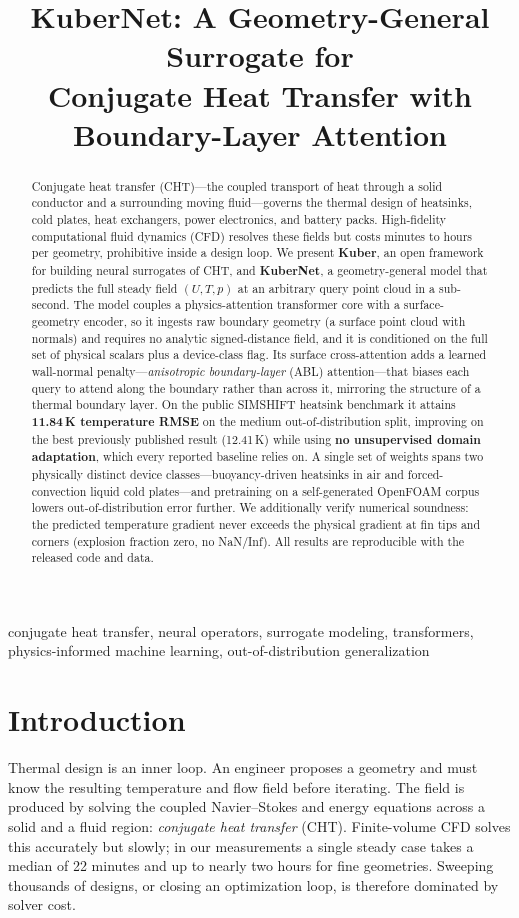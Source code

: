 \documentclass[conference]{IEEEtran}
\title{KuberNet: A Geometry-General Surrogate for\\ Conjugate Heat Transfer with Boundary-Layer Attention}
\author{\IEEEauthorblockN{Shubh Jain\textsuperscript{*}\quad Hardik Agarwal\textsuperscript{*}}
\IEEEauthorblockA{\texttt{github.com/ShubhJain007/Kuber}\\
\textsuperscript{*}\,Equal contribution}}
\begin{document}
\maketitle

\begin{abstract}
Conjugate heat transfer (CHT)---the coupled transport of heat through a solid conductor and a
surrounding moving fluid---governs the thermal design of heatsinks, cold plates, heat exchangers,
power electronics, and battery packs. High-fidelity computational fluid dynamics (CFD) resolves these fields but costs minutes to
hours per geometry, prohibitive inside a design loop. We present \textbf{Kuber}, an open framework for
building neural surrogates of CHT, and \textbf{KuberNet}, a geometry-general model that
predicts the full steady field $(U,T,p)$ at an arbitrary query point cloud in a sub-second. The model
couples a physics-attention transformer core with a surface-geometry encoder, so it ingests raw
boundary geometry (a surface point cloud with normals) and requires no analytic signed-distance
field, and it is conditioned on the full set of physical scalars plus a device-class flag. Its surface
cross-attention adds a learned wall-normal penalty---\emph{anisotropic boundary-layer} (ABL) attention---that biases each query to
attend along the boundary rather than across it, mirroring the structure of a thermal boundary layer. On the
public SIMSHIFT heatsink benchmark it attains \textbf{11.84\,K temperature RMSE} on the medium
out-of-distribution split, improving on the best previously published result (12.41\,K) while using
\textbf{no unsupervised domain adaptation}, which every reported baseline relies on. A single set of
weights spans two physically distinct device classes---buoyancy-driven heatsinks in air and
forced-convection liquid cold plates---and pretraining on a self-generated OpenFOAM corpus lowers
out-of-distribution error further. We additionally verify numerical soundness: the predicted
temperature gradient never exceeds the physical gradient at fin tips and corners (explosion fraction
zero, no NaN/Inf). All results are reproducible with the released code and data.
\end{abstract}

\begin{IEEEkeywords}
conjugate heat transfer, neural operators, surrogate modeling, transformers, physics-informed machine
learning, out-of-distribution generalization
\end{IEEEkeywords}

\section{Introduction}
Thermal design is an inner loop. An engineer proposes a geometry and must know the resulting
temperature and flow field before iterating. The field is produced by solving the coupled
Navier--Stokes and energy equations across a solid and a fluid region: \emph{conjugate heat transfer}
(CHT). Finite-volume CFD solves this accurately but slowly; in our measurements a single steady case
takes a median of 22 minutes and up to nearly two hours for fine geometries. Sweeping thousands of
designs, or closing an optimization loop, is therefore dominated by solver cost.
\end{document}
